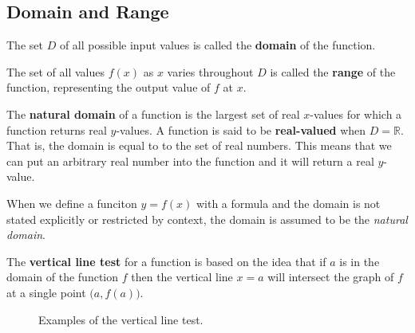 \subsection{Domain and Range}

The set \(D\) of all possible input values is called the \textbf{domain} of the function.

The set of all values \(f(x)\) as \(x\) varies throughout \(D\) is called the \textbf{range} of the function, representing the output value of \(f\) at \(x\).

 The \textbf{natural domain} of a function is the largest set of real \(x\)-values for which a function returns real \(y\)-values.
A function is said to be \textbf{real-valued} when \(D = \mathbb{R}\).
That is, the domain is equal to to the set of real numbers.
This means that we can put an arbitrary real number into the function and it will return a real $y$-value.

 \begin{remark}
     When we define a funciton \(y=f(x)\) with a formula and the domain is not stated explicitly or restricted by context, the domain is assumed to be the \emph{natural domain}.
   \end{remark}

  The \textbf{vertical line test} for a function is based on the idea that if \(a\) is in the domain of the function \(f\) then the vertical line \(x=a\) will intersect the graph of \(f\) at a single point \( \big(a,f(a)\big)\).

\begin{figure}[H]
  \begin{center}
  \end{center}
  \caption{Examples of the vertical line test.}
\end{figure}


